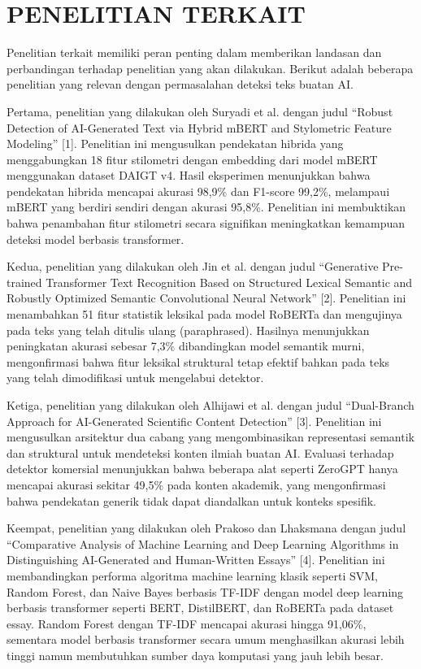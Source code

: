 \section{PENELITIAN TERKAIT}

Penelitian terkait memiliki peran penting dalam memberikan landasan dan perbandingan terhadap penelitian yang akan dilakukan. Berikut adalah beberapa penelitian yang relevan dengan permasalahan deteksi teks buatan AI.
\par Pertama, penelitian yang dilakukan oleh Suryadi et al. dengan judul “Robust Detection of AI-Generated Text via Hybrid mBERT and Stylometric Feature Modeling” [1]. Penelitian ini mengusulkan pendekatan hibrida yang menggabungkan 18 fitur stilometri dengan embedding dari model mBERT menggunakan dataset DAIGT v4. Hasil eksperimen menunjukkan bahwa pendekatan hibrida mencapai akurasi 98,9\% dan F1-score 99,2\%, melampaui mBERT yang berdiri sendiri dengan akurasi 95,8\%. Penelitian ini membuktikan bahwa penambahan fitur stilometri secara signifikan meningkatkan kemampuan deteksi model berbasis transformer.
\par Kedua, penelitian yang dilakukan oleh Jin et al. dengan judul “Generative Pre-trained Transformer Text Recognition Based on Structured Lexical Semantic and Robustly Optimized Semantic Convolutional Neural Network” [2]. Penelitian ini menambahkan 51 fitur statistik leksikal pada model RoBERTa dan mengujinya pada teks yang telah ditulis ulang (paraphrased). Hasilnya menunjukkan peningkatan akurasi sebesar 7,3\% dibandingkan model semantik murni, mengonfirmasi bahwa fitur leksikal struktural tetap efektif bahkan pada teks yang telah dimodifikasi untuk mengelabui detektor.
\par Ketiga, penelitian yang dilakukan oleh Alhijawi et al. dengan judul “Dual-Branch Approach for AI-Generated Scientific Content Detection” [3]. Penelitian ini mengusulkan arsitektur dua cabang yang mengombinasikan representasi semantik dan struktural untuk mendeteksi konten ilmiah buatan AI. Evaluasi terhadap detektor komersial menunjukkan bahwa beberapa alat seperti ZeroGPT hanya mencapai akurasi sekitar 49,5\% pada konten akademik, yang mengonfirmasi bahwa pendekatan generik tidak dapat diandalkan untuk konteks spesifik.
\par Keempat, penelitian yang dilakukan oleh Prakoso dan Lhaksmana dengan judul “Comparative Analysis of Machine Learning and Deep Learning Algorithms in Distinguishing AI-Generated and Human-Written Essays” [4]. Penelitian ini membandingkan performa algoritma machine learning klasik seperti SVM, Random Forest, dan Naive Bayes berbasis TF-IDF dengan model deep learning berbasis transformer seperti BERT, DistilBERT, dan RoBERTa pada dataset essay. Random Forest dengan TF-IDF mencapai akurasi hingga 91,06\%, sementara model berbasis transformer secara umum menghasilkan akurasi lebih tinggi namun membutuhkan sumber daya komputasi yang jauh lebih besar.
